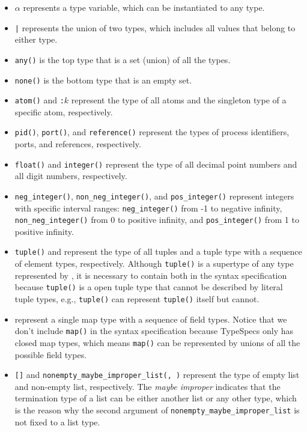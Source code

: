 \begin{itemize}
    \item \texttt{$\alpha$}
    represents a type variable, which can be instantiated to any type.
    \item \texttt{\TST|\TST}
    represents the union of two types, which includes all values that belong to either type.
    \item \texttt{any()} 
    is the top type that is a set (union) of all the types.
    \item \texttt{none()}
    is the bottom type that is an empty set.
    \item \texttt{atom()} and \texttt{:$k$}
    represent the type of all atoms and the singleton type of a specific atom, respectively.
    \item \texttt{pid()}, \texttt{port()}, and \texttt{reference()}
    represent the types of process identifiers, ports, and references, respectively.
    \item \texttt{float()} and \texttt{integer()}
    represent the type of all decimal point numbers and all digit numbers, respectively.
    \item \texttt{neg\_integer()}, \texttt{non\_neg\_integer()}, and \texttt{pos\_integer()}
    represent integers with specific interval ranges: \texttt{neg\_integer()} from -1 to negative infinity, \texttt{non\_neg\_integer()} from 0 to positive infinity, and \texttt{pos\_integer()} from 1 to positive infinity.
    \item \texttt{tuple()} and \tuple{\ov{\TST}}
    represent the type of all tuples and a tuple type with a sequence of element types, respectively.
    Although \texttt{tuple()} is a supertype of any type represented by \tuple{\ov{\TST}}, it is necessary to contain both in the syntax specification because \texttt{tuple()} is a open tuple type that cannot be described by literal tuple types, e.g., \texttt{tuple()} can represent \texttt{tuple()} itself but \tuple{\ov{\TST}} cannot.
    \item \map{\ov{\TSF}} 
    represent a single map type with a sequence of field types. 
    Notice that we don't include \texttt{map()} in the syntax specification because TypeSpecs only has closed map types, which means \texttt{map()} can be represented by unions of all the possible field types.
    \item \texttt{[]} and \texttt{nonempty\_maybe\_improper\_list(\TST, \TST)}
    represent the type of empty list and non-empty list, respectively.
    The \textit{maybe improper} indicates that the termination type of a list can be either another list or any other type, which is the reason why the second argument of \texttt{nonempty\_maybe\_improper\_list} is not fixed to a list type.

\end{itemize}
